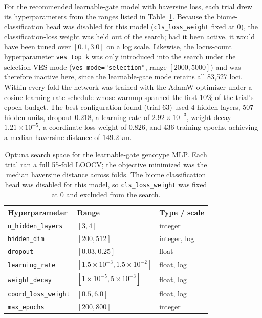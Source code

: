 \documentclass[twocolumn,10pt]{article}
\begin{document}
For the recommended learnable-gate model with haversine loss, each trial drew its hyperparameters
from the ranges listed in Table~\ref{tab:searchspace}. Because the biome-classification head was
disabled for this model (\texttt{cls\_loss\_weight} fixed at 0), the classification-loss weight was
held out of the search; had it been active, it would have been tuned over $[0.1, 3.0]$ on a log
scale. Likewise, the locus-count hyperparameter \texttt{ves\_top\_k} was only introduced into the
search under the selection VES mode (\texttt{ves\_mode="selection"}, range $[2000, 5000]$) and was
therefore inactive here, since the learnable-gate mode retains all 83{,}527 loci. Within every fold
the network was trained with the AdamW optimizer under a cosine learning-rate schedule whose warmup
spanned the first 10\% of the trial's epoch budget. The best configuration found (trial 63) used 4
hidden layers, 507 hidden units, dropout $0.218$, a learning rate of $2.92\times10^{-3}$, weight
decay $1.21\times10^{-5}$, a coordinate-loss weight of $0.826$, and 436 training epochs, achieving a
median haversine distance of $149.2$\,km.

\begin{table}[t]
\centering
\begin{tabular}{lll}
\toprule
Hyperparameter & Range & Type / scale \\
\midrule
\texttt{n\_hidden\_layers} & $[3, 4]$ & integer \\
\texttt{hidden\_dim} & $[200, 512]$ & integer, log \\
\texttt{dropout} & $[0.03, 0.25]$ & float \\
\texttt{learning\_rate} & $[1.5\times10^{-3}, 1.5\times10^{-2}]$ & float, log \\
\texttt{weight\_decay} & $[1\times10^{-5}, 5\times10^{-3}]$ & float, log \\
\texttt{coord\_loss\_weight} & $[0.5, 6.0]$ & float, log \\
\texttt{max\_epochs} & $[200, 800]$ & integer \\
\bottomrule
\end{tabular}
\caption{Optuna search space for the learnable-gate genotype MLP. Each trial ran a full 55-fold
LOOCV; the objective minimized was the median haversine distance across folds. The biome
classification head was disabled for this model, so \texttt{cls\_loss\_weight} was fixed at 0 and
excluded from the search.}
\label{tab:searchspace}
\end{table}
\end{document}
